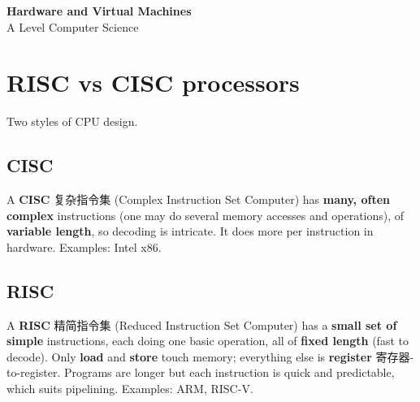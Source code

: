 \documentclass[11pt]{article}
\begin{document}
\begin{center}
  {\LARGE\bfseries Hardware and Virtual Machines}\\[0.35em]
  {\large A Level Computer Science}
\end{center}
\vspace{0.6em}

\section*{RISC vs CISC processors}

Two styles of CPU design.

\subsection*{CISC}

A \textbf{CISC} 复杂指令集 (Complex Instruction Set Computer) has \textbf{many, often complex} instructions (one may do several memory accesses and operations), of \textbf{variable length}, so decoding is intricate. It does more per instruction in hardware. Examples: Intel x86.

\subsection*{RISC}

A \textbf{RISC} 精简指令集 (Reduced Instruction Set Computer) has a \textbf{small set of simple} instructions, each doing one basic operation, all of \textbf{fixed length} (fast to decode). Only \textbf{load} and \textbf{store} touch memory; everything else is \textbf{register} 寄存器-to-register. Programs are longer but each instruction is quick and predictable, which suits pipelining. Examples: ARM, RISC-V.

\begin{center}
\end{center}
\end{document}
